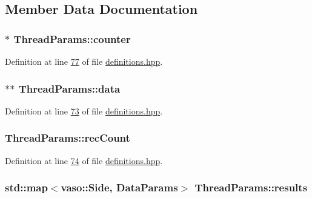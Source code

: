 \subsection{Member Data Documentation}
\hypertarget{structThreadParams_aa23fd1fa0f6a8d38cb42d8ee852bc6a6}{
\subsubsection[{counter}]{$\ast$ Thread\+Params\+::counter}}\label{structThreadParams_aa23fd1fa0f6a8d38cb42d8ee852bc6a6}


Definition at line \hyperlink{definitions_8hpp_source_l00077}{77} of file \hyperlink{definitions_8hpp_source}{definitions.\+hpp}.

\hypertarget{structThreadParams_a94da463ea449a9fe597b442be56844b9}{
\subsubsection[{data}]{$\ast$$\ast$ Thread\+Params\+::data}}\label{structThreadParams_a94da463ea449a9fe597b442be56844b9}


Definition at line \hyperlink{definitions_8hpp_source_l00073}{73} of file \hyperlink{definitions_8hpp_source}{definitions.\+hpp}.

\hypertarget{structThreadParams_a02e6a905a01a79e8b73fbe21318f82b0}{
\subsubsection[{rec\+Count}]{ Thread\+Params\+::rec\+Count}}\label{structThreadParams_a02e6a905a01a79e8b73fbe21318f82b0}


Definition at line \hyperlink{definitions_8hpp_source_l00074}{74} of file \hyperlink{definitions_8hpp_source}{definitions.\+hpp}.

\hypertarget{structThreadParams_a2332b920eca7ca1fa61cc078e99e0668}{
\subsubsection[{results}]{\setlength{\rightskip}{0pt plus 5cm}std\+::map$<${\bf vaso\+::\+Side}, {\bf Data\+Params}$>$ Thread\+Params\+::results}}\label{structThreadParams_a2332b920eca7ca1fa61cc078e99e0668}


